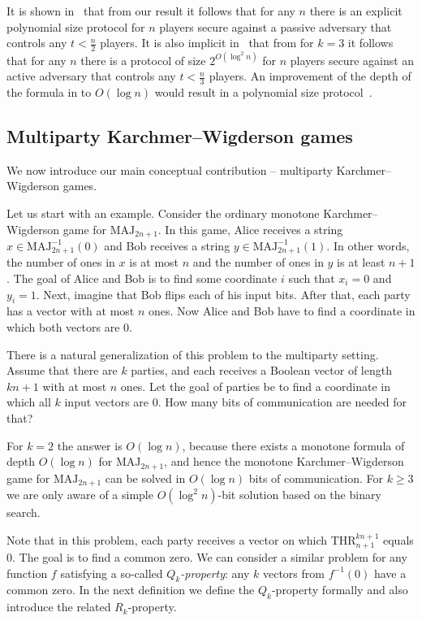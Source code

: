 \documentclass{toc}
\def\MAJ{\mathrm{MAJ}}
\def\THR{\mathrm{THR}}
\begin{document}
It is shown in~\cite{Cohen2013} that from our result it follows that for any $n$ there is an explicit polynomial size protocol for $n$ players secure against a passive adversary that controls any $t < \frac n2$ players. It is also implicit in~\cite{Cohen2013} that from  for $k=3$ it follows that for any $n$ there is a protocol of size $2^{O(\log^2 n)}$ for $n$ players secure against an active adversary that controls any $t < \frac n3$ players. An improvement of the depth of the formula in  to $O(\log n)$ would result in a polynomial size protocol~\cite{Cohen2013}. 



\subsection{Multiparty Karchmer--Wigderson games}

We now introduce our main conceptual contribution -- multiparty Karchmer--Wigderson games.


 Let us start with an example. Consider the ordinary monotone Karchmer--Wigderson game for $\MAJ_{2n + 1}$. In this game, Alice receives a string $x\in \MAJ_{2n + 1}^{-1}(0)$ and Bob receives a string $y \in\MAJ_{2n + 1}^{-1}(1)$. In other words, the number of ones in $x$ is at most $n$ and the number of ones in $y$ is at least  $n + 1$. The goal of Alice and Bob is to find some coordinate $i$ such that $x_i = 0$ and $y_i = 1$. Next, imagine that Bob flips each of his input bits. After that, each party has a vector with at most $n$ ones. Now Alice and Bob have to find a coordinate in which both vectors are $0$.

There is a natural generalization of this problem to the multiparty setting.
%
Assume that there are $k$ parties, and each receives a Boolean vector of length $kn + 1$ with at most $n$ ones. Let the goal of parties be to find a coordinate in which all $k$ input vectors are $0$. How many bits of communication are needed for that?

For $k = 2$ the answer is $O(\log n)$, because there exists 
%
a monotone formula of depth $O(\log n)$  %
for $\MAJ_{2n + 1}$, and hence the monotone Karchmer--Wigderson game for $\MAJ_{2n + 1}$ can be solved in $O(\log n)$ bits of communication. For $k \ge 3$ we are only aware of a simple $O(\log^2 n)$-bit solution based on the binary search.

Note that in this problem, each party receives a vector on which $\THR^{kn + 1}_{n + 1}$ equals $0$. The goal is to find a common zero.  We can consider a similar problem for any function $f$ satisfying a so-called \emph{$Q_k$-property}: any $k$ vectors from $f^{-1}(0)$ have a common zero. In the next definition we define the $Q_k$-property formally and also introduce the related $R_k$-property.
\end{document}
